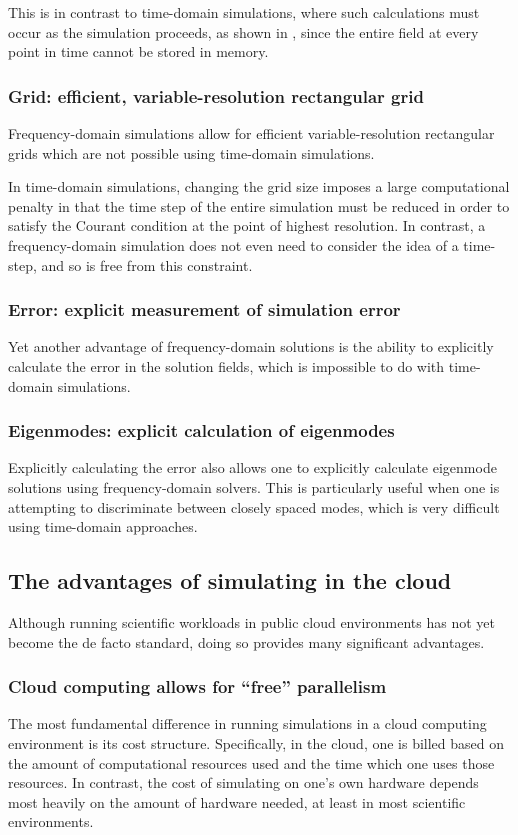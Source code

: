 \documentclass{article}
\begin{document}
This is in contrast to time-domain simulations,
    where such calculations must occur as the simulation proceeds, 
    as shown in ,
    since the entire field at every point in time cannot be stored in memory.

\subsubsection{Grid: efficient, variable-resolution rectangular grid}
Frequency-domain simulations allow for efficient variable-resolution
    rectangular grids which are not possible using time-domain simulations.

In time-domain simulations, changing the grid size imposes a large 
    computational penalty in that the time step of the entire simulation
    must be reduced in order to satisfy the Courant condition at the
    point of highest resolution.
In contrast, a frequency-domain simulation does not even need
    to consider the idea of a time-step, and 
    so is free from this constraint.


\subsubsection{Error: explicit measurement of simulation error}
Yet another advantage of frequency-domain solutions is the ability
    to explicitly calculate the error in the solution fields,
    which is impossible to do with time-domain simulations.

\subsubsection{Eigenmodes: explicit calculation of eigenmodes}
Explicitly calculating the error also allows one 
    to explicitly calculate eigenmode solutions
    using frequency-domain solvers.
This is particularly useful when one is attempting to
    discriminate between closely spaced modes,
    which is very difficult using time-domain approaches.

\subsection{The advantages of simulating in the cloud}
Although running scientific workloads in public cloud environments
    has not yet become the de facto standard,
    doing so provides many significant advantages.

\subsubsection{Cloud computing allows for ``free'' parallelism}
The most fundamental difference in running simulations
    in a cloud computing environment is its cost structure.
Specifically, in the cloud, 
    one is billed based on the amount of computational resources used
    and the time which one uses those resources.
In contrast, the cost of simulating on one's own hardware
    depends most heavily on the amount of hardware needed,
    at least in most scientific environments.
\end{document}
